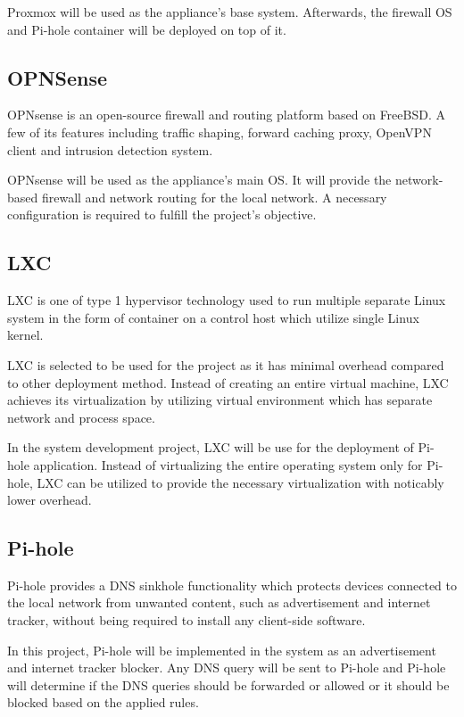 \documentclass[../index.tex]{subfiles}
\begin{document}
Proxmox will be used as the appliance's base system. Afterwards, the firewall OS and Pi-hole
container will be deployed on top of it.

\subsection{OPNSense}

OPNsense is an open-source firewall and routing platform based on FreeBSD.
A few of its features including traffic shaping, forward caching proxy, OpenVPN client
and intrusion detection system.

OPNsense will be used as the appliance's main OS. It will provide the network- based firewall and
network routing for the local network. A necessary configuration is required to fulfill the
project's objective.

\subsection{LXC}

LXC is one of type 1 hypervisor technology used to run multiple separate
Linux system in the form of container on a control host which utilize single Linux
kernel.

LXC is selected to be used for the project as it has minimal overhead compared
to other deployment method. Instead of creating an entire virtual machine, LXC
achieves its virtualization by utilizing virtual environment which has separate network
and process space.

In the system development project, LXC will be use for the deployment of Pi-
hole application. Instead of virtualizing the entire operating system only for Pi-hole,
LXC can be utilized to provide the necessary virtualization with noticably lower
overhead.

\subsection{Pi-hole}

Pi-hole provides a DNS sinkhole functionality which protects devices
connected to the local network from unwanted content, such as advertisement and
internet tracker, without being required to install any client-side software.

In this project, Pi-hole will be implemented in the system as an advertisement
and internet tracker blocker. Any DNS query will be sent to Pi-hole and Pi-hole will
determine if the DNS queries should be forwarded or allowed or it should be blocked
based on the applied rules.
\end{document}
